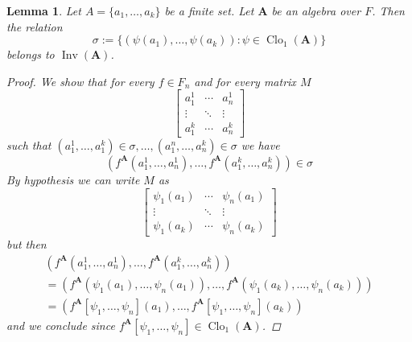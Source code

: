\documentclass{amsart}
\theoremstyle{plain}
\newtheorem{lemma}[theorem]{Lemma}
\theoremstyle{definition}
\theoremstyle{remark}
\DeclareMathOperator{\Clo}{Clo}
\DeclareMathOperator{\Inv}{Inv}
\begin{document}
\begin{lemma}
    \label{clo1_group}
    Let $A=\{a_1, \ldots, a_k\}$ be a finite set. 
    Let $\mathbf{A}$ be an algebra over $F$. 
    Then the relation 
    \begin{equation}
        \sigma:=\{(\psi(a_1), \ldots, \psi(a_k)) : \psi \in \Clo_1(\mathbf{A})\}
    \end{equation}
    belongs to $\Inv(\mathbf{A})$. 
    \begin{proof}
        We show that for every $f \in F_n$ and for every matrix $M$
        \begin{equation*}
            \begin{bmatrix}
              a^1_1 & \cdots & a^1_n \\
              \vdots & \ddots &  \vdots  \\
              a^k_1 & \cdots & a^k_n
              \end{bmatrix}
          \end{equation*}
          such that $(a_1^1, \ldots, a^k_1) \in \sigma, \ldots, (a_1^n, \ldots, a^k_n) \in \sigma$ we have 
          \begin{equation*}
            (f^{\mathbf{A}}(a_1^1, \ldots, a^1_n), \ldots,f^{\mathbf{A}}(a^k_1, \ldots, a^k_n)) \in \sigma
          \end{equation*} 
          By hypothesis we can write $M$ as 
          \begin{equation*}
            \begin{bmatrix}
              \psi_1(a_1) & \cdots & \psi_n(a_1) \\
              \vdots & \ddots &  \vdots  \\
              \psi_1(a_k) & \cdots & \psi_n(a_k)
              \end{bmatrix}
          \end{equation*}
          but then 
        \begin{multline*}
            (f^{\mathbf{A}}(a_1^1, \ldots, a^1_n), \ldots,f^{\mathbf{A}}(a^k_1, \ldots, a^k_n))\\
             = (f^{\mathbf{A}}(\psi_1(a_1), \ldots, \psi_n(a_1)), \ldots,f^{\mathbf{A}}(\psi_1(a_k), \ldots, \psi_n(a_k))) \\
             = (f^{\mathbf{A}}[\psi_1, \ldots, \psi_n](a_1), \ldots, f^{\mathbf{A}}[\psi_1, \ldots, \psi_n](a_k))
        \end{multline*}
        and we conclude since $f^{\mathbf{A}}[\psi_1, \ldots, \psi_n] \in \Clo_1(\mathbf{A})$. 
    \end{proof}
\end{lemma}
\end{document}
